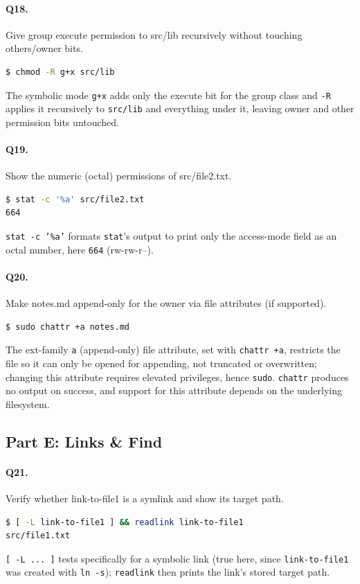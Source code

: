 \paragraph{Q18.} Give group execute permission to src/lib recursively without touching others/owner bits.
\begin{lstlisting}[language=bash,caption={Q18 evidence: \texttt{chmod -R g+x src/lib}},label={Listing:Q18}]
$ chmod -R g+x src/lib
\end{lstlisting}
The symbolic mode \texttt{g+x} adds only the execute bit for the group class and \texttt{-R} applies it recursively to \texttt{src/lib} and everything under it, leaving owner and other permission bits untouched.

\paragraph{Q19.} Show the numeric (octal) permissions of src/file2.txt.
\begin{lstlisting}[language=bash,caption={Q19 evidence: \texttt{stat -c '\%a' src/file2.txt}},label={Listing:Q19}]
$ stat -c '%a' src/file2.txt
664
\end{lstlisting}
\texttt{stat -c '\%a'} formats \texttt{stat}'s output to print only the access-mode field as an octal number, here \texttt{664} (rw-rw-r--).

\paragraph{Q20.} Make notes.md append-only for the owner via file attributes (if supported).
\begin{lstlisting}[language=bash,caption={Q20 evidence: \texttt{sudo chattr +a notes.md}},label={Listing:Q20}]
$ sudo chattr +a notes.md
\end{lstlisting}
The ext-family \texttt{a} (append-only) file attribute, set with \texttt{chattr +a}, restricts the file so it can only be opened for appending, not truncated or overwritten; changing this attribute requires elevated privileges, hence \texttt{sudo}. \texttt{chattr} produces no output on success, and support for this attribute depends on the underlying filesystem.

\subsection{Part E: Links \& Find}
\paragraph{Q21.} Verify whether link-to-file1 is a symlink and show its target path.
\begin{lstlisting}[language=bash,caption={Q21 evidence: \texttt{[ -L link-to-file1 ] \&\& readlink link-to-file1}},label={Listing:Q21}]
$ [ -L link-to-file1 ] && readlink link-to-file1
src/file1.txt
\end{lstlisting}
\texttt{[ -L ... ]} tests specifically for a symbolic link (true here, since \texttt{link-to-file1} was created with \texttt{ln -s}); \texttt{readlink} then prints the link's stored target path.

